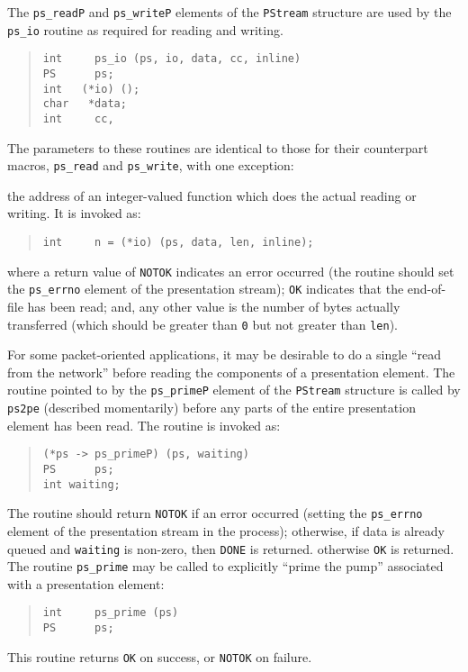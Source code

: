 The \verb"ps_readP" and \verb"ps_writeP" elements of the \verb"PStream"
structure are used by the \verb"ps_io" routine as required for reading and
writing.
\begin{quote}\small\begin{verbatim}
int     ps_io (ps, io, data, cc, inline)
PS      ps;
int   (*io) ();
char   *data;
int     cc,
\end{verbatim}\end{quote}
The parameters to these routines are identical to those for their counterpart
macros, \verb"ps_read" and \verb"ps_write",
with one exception:
\begin{describe}
\item[\verb"io":] the address of an integer-valued function which does the
actual reading or writing.
It is invoked as:
\begin{quote}\small\begin{verbatim}
int     n = (*io) (ps, data, len, inline);
\end{verbatim}\end{quote}
\end{describe}
where a return value of \verb"NOTOK" indicates an error occurred
(the routine should set the \verb"ps_errno" element of the presentation
stream);
\verb"OK" indicates that the end-of-file has been read;
and,
any other value is the number of bytes actually transferred
(which should be greater than \verb"0" but not greater than \verb"len").

For some packet-oriented applications,
it may be desirable to do a single ``read from the network'' before
reading the components of a presentation element.
The routine pointed to by the \verb"ps_primeP" element of the \verb"PStream"
structure is called by \verb"ps2pe" (described momentarily)
before any parts of the entire presentation element has been read.
The routine is invoked as:
\begin{quote}\small\begin{verbatim}
(*ps -> ps_primeP) (ps, waiting)
PS      ps;
int	waiting;
\end{verbatim}\end{quote}
The routine should return \verb"NOTOK" if an error occurred
(setting the \verb"ps_errno" element of the presentation stream in the
process);
otherwise,
if  data is already queued and \verb"waiting" is non-zero,
then \verb"DONE" is returned.
otherwise \verb"OK" is returned.
The routine \verb"ps_prime" may be called to explicitly ``prime the pump''
associated with a presentation element:
\begin{quote}\small\begin{verbatim}
int     ps_prime (ps)
PS      ps;
\end{verbatim}\end{quote}
This routine returns \verb"OK" on success,
or \verb"NOTOK" on failure.

